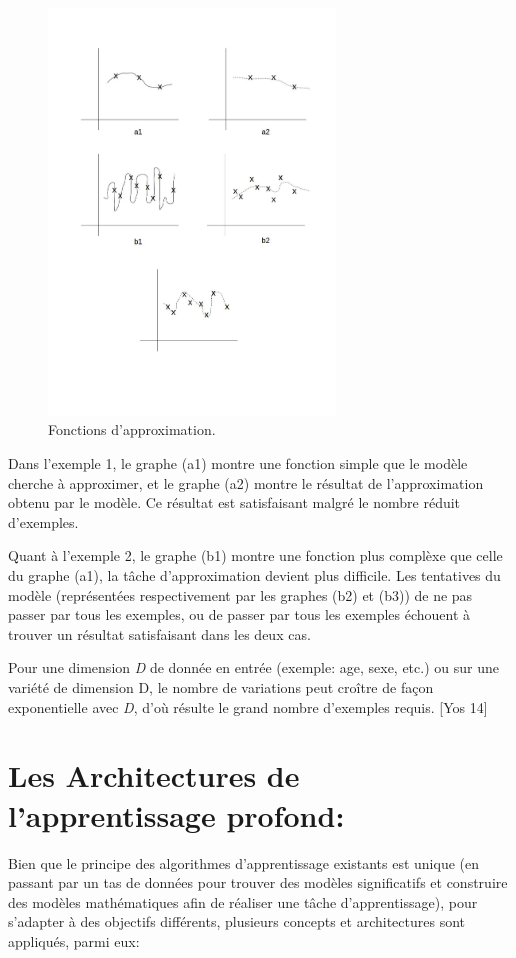 \begin{figure}[H]
	\centering
		\includegraphics[width=3in]{Figures/highVariation.jpg}
	\caption[FA]{Fonctions d'approximation.}
	\label{fig:Electron}
\end{figure}


Dans l'exemple 1, le graphe (a1) montre une fonction simple que le modèle cherche à approximer, et le graphe (a2) montre le résultat de l'approximation obtenu par le modèle. Ce résultat est satisfaisant malgré le nombre  réduit d'exemples.

Quant à l'exemple 2, le graphe (b1) montre une fonction plus complèxe que celle du graphe (a1), la tâche d'approximation devient plus difficile. Les tentatives du modèle  (représentées respectivement par les graphes (b2) et (b3)) de ne pas passer par tous les exemples, ou de passer par tous les exemples échouent à trouver un résultat satisfaisant dans les deux cas. 

Pour une dimension \textit{D} de donnée en entrée (exemple: age, sexe, etc.) ou sur une variété de dimension D, le nombre de variations peut croître de façon exponentielle avec \textit{D}, d'où résulte le grand nombre d'exemples requis. [Yos 14]

\section{Les Architectures de l'apprentissage profond:}

Bien que le principe des algorithmes d'apprentissage existants est unique (en passant par un tas de données pour trouver des modèles significatifs et construire des modèles mathématiques afin de réaliser une tâche d'apprentissage), pour s'adapter à des objectifs différents, plusieurs concepts et architectures sont appliqués, parmi eux:
 

